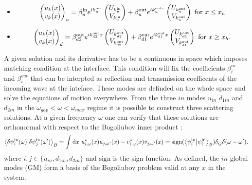 \begin{itemize}
    
\item\begin{equation}
    \begin{pmatrix}
        u_k(x) \\
        v_k(x)
    \end{pmatrix}_{u} =\beta^{\mathrm{in}}_ue^{{ik_u^{{\mathrm{in}}x}}}\begin{pmatrix}
        U_{k^\mathrm{in}_{u}} \\
        V_{k^\mathrm{in}_{u}}
    \end{pmatrix}
    +
    \beta^{\mathrm{out}}_u e^{ik_u^{{\mathrm{out}}x}}\begin{pmatrix}
        U_{k^\mathrm{out}_{u}} \\
        V_{k^\mathrm{out}_{u}}
    \end{pmatrix} \ \mathrm{for} \ x\leq x_h
\end{equation} 

\item\begin{equation}
    \begin{pmatrix}
        u_k(x) \\
        v_k(x)
    \end{pmatrix}_{d} = \beta^{\mathrm{out}}_{d2} e^{ik^{\mathrm{out}}_{d2}x}
    \begin{pmatrix}
        U_{k^\mathrm{out}_{d2}} \\
        V_{k^\mathrm{out}_{d2}}
    \end{pmatrix} + \beta^{\mathrm{out}}_{d1} e^{ik^{\mathrm{out}}_{d1}x}
    \begin{pmatrix}
        U_{k^\mathrm{out}_{d1}} \\
        V_{k^\mathrm{out}_{d1}} 
    \end{pmatrix} \ \mathrm{for} \ x\geq x_h.
\end{equation}
\end{itemize}

A given solution and its derivative has to be a continuous in space which imposes matching condition at the interface. This condition will fix the coefficients $\beta_i^{in}$ and $\beta_i^{out}$ that can be interpted as reflection and transmission coefficents of the incoming wave at the inteface. 
These modes are definded on the whole space and solve the equations of motion everywhere. From the three $in$ modes $u_{in}$ $d_{1in}$ and $d_{2in}$ in the $\omega_{gap}<\omega<\omega_{max}$ regime it is possible to construct three scattering solutions. At a given frequency $\omega$ one can verify that these solutions are orthonormal with respect to the Bogoliubov inner product :
\begin{equation}
    \bra{\dpsi^\mathrm{in}_i(\omega)}\ket{\dpsi^\mathrm{in}_j(\omega')}_B = \int \mathrm{d}x  \ u^*_{i,\omega}(x)u_{j,\omega'}(x)-v^*_{i,\omega}(x)v_{j,\omega'}(x)  = \mathrm{sign}(\bra{\psi^\mathrm{in}_i}\ket{\psi^\mathrm{in}_i}_B)\delta_{ij}\delta(\omega-\omega').
\end{equation} 
where $i,j \in \{u_{in},d_{1in},d_{2in}\}$ and $\mathrm{sign}$ is the sign function. 
As defined, the $in$ global modes (GM) form a basis of the Bogoliubov problem valid at any $x$ in the system.

